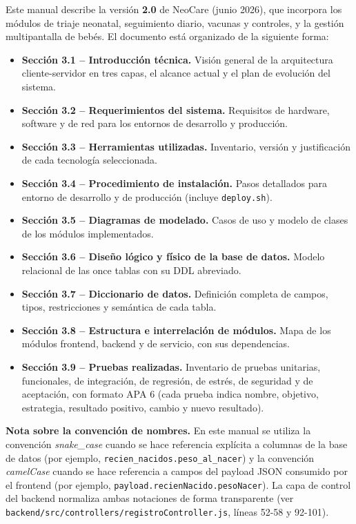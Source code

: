 \documentclass[12pt,letterpaper]{article}
\begin{document}
\noindent Este manual describe la versión \textbf{2.0} de NeoCare (junio 2026), que incorpora los módulos de triaje neonatal, seguimiento diario, vacunas y controles, y la gestión multipantalla de bebés. El documento está organizado de la siguiente forma:

\begin{itemize}[leftmargin=1.4cm]
    \item \textbf{Sección 3.1 -- Introducción técnica.} Visión general de la arquitectura cliente-servidor en tres capas, el alcance actual y el plan de evolución del sistema.
    \item \textbf{Sección 3.2 -- Requerimientos del sistema.} Requisitos de hardware, software y de red para los entornos de desarrollo y producción.
    \item \textbf{Sección 3.3 -- Herramientas utilizadas.} Inventario, versión y justificación de cada tecnología seleccionada.
    \item \textbf{Sección 3.4 -- Procedimiento de instalación.} Pasos detallados para entorno de desarrollo y de producción (incluye \texttt{deploy.sh}).
    \item \textbf{Sección 3.5 -- Diagramas de modelado.} Casos de uso y modelo de clases de los módulos implementados.
    \item \textbf{Sección 3.6 -- Diseño lógico y físico de la base de datos.} Modelo relacional de las once tablas con su DDL abreviado.
    \item \textbf{Sección 3.7 -- Diccionario de datos.} Definición completa de campos, tipos, restricciones y semántica de cada tabla.
    \item \textbf{Sección 3.8 -- Estructura e interrelación de módulos.} Mapa de los módulos frontend, backend y de servicio, con sus dependencias.
    \item \textbf{Sección 3.9 -- Pruebas realizadas.} Inventario de pruebas unitarias, funcionales, de integración, de regresión, de estrés, de seguridad y de aceptación, con formato APA 6 (cada prueba indica nombre, objetivo, estrategia, resultado positivo, cambio y nuevo resultado).
\end{itemize}

\noindent\textbf{Nota sobre la convención de nombres.} En este manual se utiliza la convención \textit{snake\_case} cuando se hace referencia explícita a columnas de la base de datos (por ejemplo, \texttt{recien\_nacidos.peso\_al\_nacer}) y la convención \textit{camelCase} cuando se hace referencia a campos del payload JSON consumido por el frontend (por ejemplo, \texttt{payload.recienNacido.pesoNacer}). La capa de control del backend normaliza ambas notaciones de forma transparente (ver \texttt{backend/src/controllers/registroController.js}, líneas 52-58 y 92-101).
\end{document}
